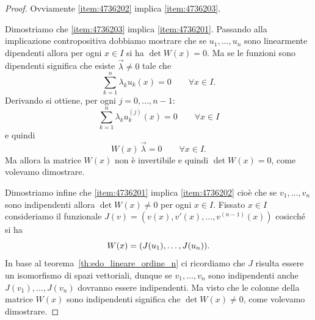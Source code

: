 \begin{proof}
Ovviamente \ref{item:4736202} implica \ref{item:4736203}.

Dimostriamo che \ref{item:4736203} implica \ref{item:4736201}.
Passando alla implicazione contropositiva dobbiamo mostrare che
se $u_1,\dots, u_n$ sono linearmente dipendenti allora per ogni $x\in I$ si ha $\det W(x)=0$. Ma se le funzioni sono dipendenti significa che esiste $\vec \lambda \neq 0$ tale che
\begin{equation}\label{eq:3675893}
\sum_{k=1}^n \lambda_k u_k(x) = 0\qquad \forall x \in I.
\end{equation}
Derivando si ottiene, per ogni $j=0,\dots, n-1$:
\[
\sum_{k=1}^n \lambda_k u_k^{(j)}(x) = 0\qquad \forall x \in I
\]
e quindi
\[
  W(x) \, \vec \lambda = 0 \qquad \forall x\in I.
\]
Ma allora la matrice $W(x)$ non è invertibile e quindi $\det W(x)=0$, come volevamo dimostrare.

Dimostriamo infine che \ref{item:4736201} implica \ref{item:4736202}
cioè che se $v_1, \dots, v_n$ sono indipendenti allora $\det W(x) \neq 0$ per ogni $x\in I$.
Fissato $x\in I$ consideriamo il funzionale $J(v) = (v(x),v'(x), \dots, v^{(n-1)}(x))$ cosicché si ha
\[
  W(x) = {\left( J(u_1), \dots, J(u_n) \right)}.
\]
In base al teorema~\ref{th:edo_lineare_ordine_n} ci ricordiamo che $J$ risulta essere un isomorfismo di spazi vettoriali, dunque se $v_1,\dots,v_n$ sono indipendenti anche $J(v_1),\dots, J(v_n)$ dovranno essere indipendenti.
Ma visto che le colonne della matrice $W(x)$ sono indipendenti significa che $\det W(x)\neq 0$, come volevamo dimostrare.
\end{proof}

